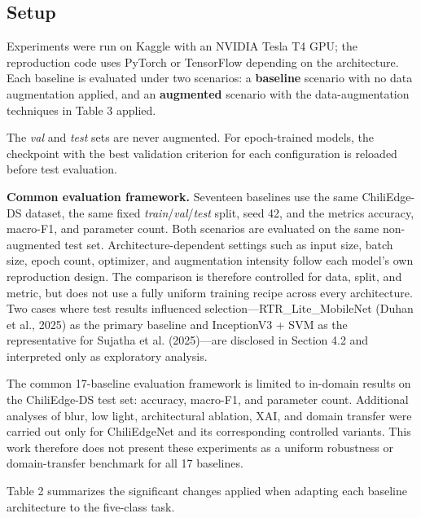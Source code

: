\subsection{Setup}\label{setup}

Experiments were run on Kaggle with an NVIDIA Tesla T4 GPU; the reproduction code uses PyTorch or TensorFlow depending on the architecture. Each baseline is evaluated under two scenarios: a \textbf{baseline} scenario with no data augmentation applied, and an \textbf{augmented} scenario with the data-augmentation techniques in Table 3 applied.

The \emph{val} and \emph{test} sets are never augmented. For epoch-trained models, the checkpoint with the best validation criterion for each configuration is reloaded before test evaluation.

\textbf{Common evaluation framework.} Seventeen baselines use the same ChiliEdge-DS dataset, the same fixed \emph{train}/\emph{val}/\emph{test} split, seed 42, and the metrics accuracy, macro-F1, and parameter count. Both scenarios are evaluated on the same non-augmented test set. Architecture-dependent settings such as input size, batch size, epoch count, optimizer, and augmentation intensity follow each model's own reproduction design. The comparison is therefore controlled for data, split, and metric, but does not use a fully uniform training recipe across every architecture. Two cases where test results influenced selection---RTR\_Lite\_MobileNet (Duhan et al., 2025) as the primary baseline and InceptionV3 + SVM as the representative for Sujatha et al. (2025)---are disclosed in Section 4.2 and interpreted only as exploratory analysis.

The common 17-baseline evaluation framework is limited to in-domain results on the ChiliEdge-DS test set: accuracy, macro-F1, and parameter count. Additional analyses of blur, low light, architectural ablation, XAI, and domain transfer were carried out only for ChiliEdgeNet and its corresponding controlled variants. This work therefore does not present these experiments as a uniform robustness or domain-transfer benchmark for all 17 baselines.

Table 2 summarizes the significant changes applied when adapting each baseline architecture to the five-class task.

